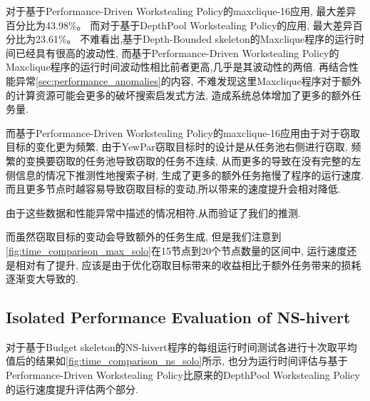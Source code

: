 \documentclass{mproj}
\begin{document}
\begin{itemize}
\begin{equation}
              \label{eq:variability_percentage}
          \end{equation}
          对于基于Performance-Driven Workstealing Policy的maxclique-16应用,
          最大差异百分比为43.98\%。
          而对于基于DepthPool Workstealing Policy的应用,
          最大差异百分比为23.61\%。
          不难看出,基于Depth-Bounded skeleton的Maxclique程序的运行时间已经具有很高的波动性,
          而基于Performance-Driven Workstealing Policy的Maxclique程序的运行时间波动性相比前者更高,几乎是其波动性的两倍.
          再结合性能异常\ref{sec:performance_anomalies}的内容,
          不难发现这里Maxclique程序对于额外的计算资源可能会更多的破坏搜索启发式方法,
          造成系统总体增加了更多的额外任务量.

          而基于Performance-Driven Workstealing Policy的maxclique-16应用由于对于窃取目标的变化更为频繁,
          由于YewPar窃取目标时的设计是从任务池右侧进行窃取,
          频繁的变换要窃取的任务池导致窃取的任务不连续,
          从而更多的导致在没有完整的左侧信息的情况下推测性地搜索子树,
          生成了更多的额外任务拖慢了程序的运行速度.
          而且更多节点时越容易导致窃取目标的变动,所以带来的速度提升会相对降低.

          由于这些数据和性能异常中描述的情况相符,从而验证了我们的推测.

          而虽然窃取目标的变动会导致额外的任务生成,
          但是我们注意到\cref{fig:time_comparison_max_solo}在15节点到20个节点数量的区间中,
          运行速度还是相对有了提升,
          应该是由于优化窃取目标带来的收益相比于额外任务带来的损耗逐渐变大导致的.
\end{itemize}


\subsection{Isolated Performance Evaluation of NS-hivert}

对于基于Budget skeleton的NS-hivert程序的每组运行时间测试各进行十次取平均值后的结果如\cref{fig:time_comparison_ns_solo}所示,
也分为运行时间评估与基于Performance-Driven Workstealing Policy比原来的DepthPool Workstealing Policy的运行速度提升评估两个部分.
\end{document}
